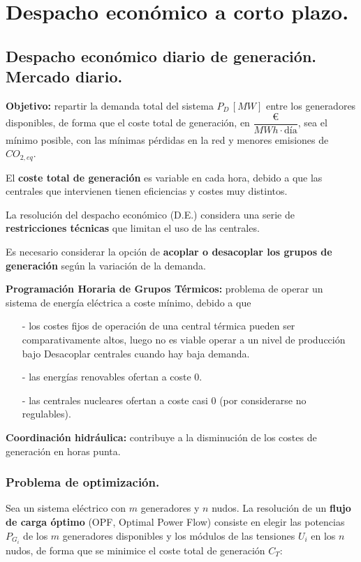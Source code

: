 \chapter{Despacho económico a corto plazo.}
	\section{Despacho económico diario de generación. Mercado diario.}
		\textbf{Objetivo:} repartir la demanda total del sistema $P_D\,[MW]$ entre los generadores disponibles, de forma que el coste total de generación, en $\dfrac{\euro}{MWh\cdot \text{día}}$, sea el mínimo posible, con las mínimas pérdidas en la red y menores emisiones de $CO_{2,eq}$.
		
		
		El \textbf{coste total de generación} es variable en cada hora, debido a que las centrales que intervienen tienen eficiencias y costes muy distintos.
		
		
		La resolución del despacho económico (D.E.) considera una serie de \textbf{restricciones técnicas} que limitan el uso de las centrales.
		
		
		Es necesario considerar la opción de \textbf{acoplar o desacoplar los grupos de generación} según la variación de la demanda.
		
		
		\textbf{Programación Horaria de Grupos Térmicos:} problema de operar un sistema de energía eléctrica a coste mínimo, debido a que
		
		\begin{itemize}
			\item[-] los costes fijos de operación de una central térmica pueden ser comparativamente altos, luego no es viable operar a un nivel de producción bajo \textrightarrow Desacoplar centrales cuando hay baja demanda.
			\item[-] las energías renovables ofertan a coste 0.
			\item[-] las centrales nucleares ofertan a coste casi 0 (por considerarse no regulables).
		\end{itemize}
		
		
		\textbf{Coordinación hidráulica:} contribuye a la disminución de los costes de generación en horas punta.
	
		\subsection{Problema de optimización.}
			Sea un sistema eléctrico con $m$ generadores y $n$ nudos. La resolución de un \textbf{flujo de carga óptimo} (OPF, Optimal Power Flow) consiste en elegir las potencias $P_{G_i}$ de los $m$ generadores disponibles y los módulos de las tensiones $U_i$ en los $n$ nudos, de forma que se minimice el coste total de generación $C_T$:
			
